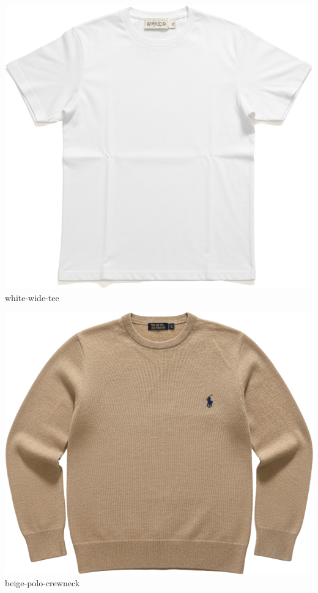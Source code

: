 \documentclass[10pt]{article}
\begin{document}
\begin{minipage}[t]{0.22\textwidth}\centering\vspace{0mm}
\includegraphics[width=\linewidth,keepaspectratio]{assets/tees/white-wide-tee.png}\\
\vspace{0.5mm}\tiny white-wide-tee\end{minipage}
\begin{minipage}[t]{0.22\textwidth}\centering\vspace{0mm}
\includegraphics[width=\linewidth,keepaspectratio]{assets/midlayer/beige-polo-crewneck.png}\\
\vspace{0.5mm}\tiny beige-polo-crewneck\end{minipage}
\end{document}
